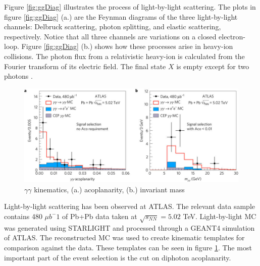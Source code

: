 Figure \ref{fig:ggDiag} illustrates the process of light-by-light scattering. The plots in figure \ref{fig:ggDiag} (a.) are the Feynman diagrams of the three light-by-light channels: Delbruck scattering, photon splitting, and elastic scattering, respectively. Notice that all three channels are variations on a closed electron-loop. Figure \ref{fig:ggDiag} (b.) shows how these processes arise in heavy-ion collisions. The photon flux from a relativistic heavy-ion is calculated from the Fourier transform of its electric field. The final state $X$ is empty except for two photons \cite{Aaboud:2017bwk}. 

\begin{figure}[]
\begin{centering}
\includegraphics[width=7in]{Chapter2/importfigs/nphys4208-f3.jpg}
\par\end{centering}
\caption{$\gamma \gamma$ kinematics, (a.) acoplanarity, (b.) invariant mass \cite{Aaboud:2017bwk} \label{fig:ggKin}}
\end{figure}

Light-by-light scattering has been observed at ATLAS. The relevant data sample contains 480 $\mu b^-1$ of Pb+Pb data taken at $\sqrt{s_{NN}}=5.02$ TeV. Light-by-light MC was generated using STARLIGHT and processed through a GEANT4 simulation of ATLAS. The reconstructed MC was used to create kinematic templates for comparison against the data. These templates can be seen in figure \ref{fig:ggKin}. The most important part of the event selection is the cut on diphoton acoplanarity. 

